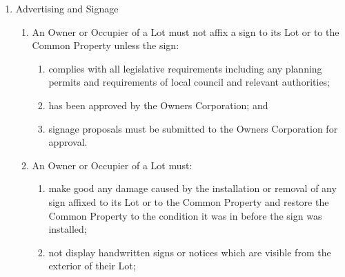 \documentclass{article}
\begin{document}
\begin{enumerate}[label=\arabic*.]
\begin{enumerate}[label=\arabic{enumi}.\arabic*.]
\begin{enumerate}[label=\arabic{enumi}.\arabic*.]
\begin{enumerate}[label=(\arabic*)]
\begin{enumerate}[label=(\alph*)]

\item  operates their business lawfully;

\item  obtains all liquor licences or other permits or consents required by Law; and

\item  conducts their business in accordance with any liquor licence, permit, consent and all relevant Laws.

\end{enumerate}

\end{enumerate}

\item  Advertising and Signage

\begin{enumerate}[label=(\arabic*)]

\item  An Owner or Occupier of a Lot must not affix a sign to its Lot or to the Common Property unless the sign:

\begin{enumerate}[label=(\alph*)]

\item  complies with all legislative requirements including any planning permits and requirements of local council and relevant authorities;

\item  has been approved by the Owners Corporation; and

\item  signage proposals must be submitted to the Owners Corporation for approval.

\end{enumerate}

\item  An Owner or Occupier of a Lot must:

\begin{enumerate}[label=(\alph*)]

\item  make good any damage caused by the installation or removal of any sign affixed to its Lot or to the Common Property and restore the Common Property to the condition it was in before the sign was installed;

\item  not display handwritten signs or notices which are visible from the exterior of their Lot;


\end{enumerate}
\end{enumerate}
\end{enumerate}
\end{enumerate}
\end{enumerate}
\end{document}
